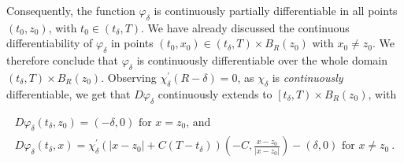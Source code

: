 Consequently, the function $ \varphi_{\delta} $ is continuously partially differentiable in all points $ (t_0, z_0) $, with $ t_0 \in \left(t_{\delta}, T \right) $. We have already discussed the continuous differentiability of $ \varphi_{\delta} $ in points $ (t_0, x_0) \in \left(t_{\delta}, T \right) \times B_R (z_0) $ with $ x_0 \neq z_0 $. We therefore conclude that $ \varphi_{\delta} $ is continuously differentiable over the whole domain $ \left(t_{\delta}, T \right) \times B_R (z_0) $. Observing $ \chi_{\delta}^{\prime}(R - \delta) = 0 $, as $ \chi_{\delta} $ is \emph{continuously} differentiable, we get that $ D \varphi_{\delta} $ continuously extends to $ \left[t_{\delta}, T \right) \times B_R (z_0) $, with

\begin{gather*}
	D \varphi_{\delta}(t_{\delta}, z_0) = \left(- \delta, 0 \right) \text{ for } x= z_0 \text{, and }\\
	D \varphi_{\delta}(t_{\delta}, x) = \chi_{\delta}^{\prime}\left(\lvert x - z_0 \rvert + C(T - t_{\delta})\right)\left(- C, \frac{x - z_0}{\lvert x - z_0 \rvert}\right) - \left(\delta, 0 \right) \text{ for } x \neq z_0 \ .
\end{gather*}